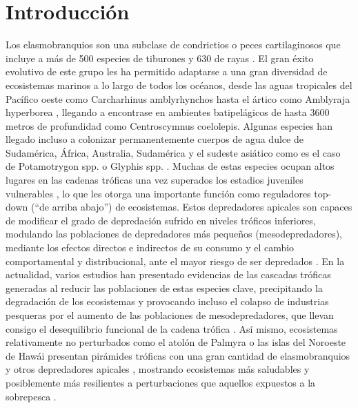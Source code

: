 \documentclass[a4paper, 11pt]{article}
\begin{document}
\section{Introducción}
Los elasmobranquios son una subclase de condrictios o peces cartilaginosos que incluye a más de 500 especies de tiburones y 630 de rayas \cite{Elbert2013}. El gran éxito evolutivo de este grupo les ha permitido adaptarse a una gran diversidad de ecosistemas marinos a lo largo de todos los océanos, desde las aguas tropicales del Pacífico oeste como Carcharhinus amblyrhynchos \cite{Wetherbee1997} hasta el ártico como Amblyraja hyperborea \cite{Lynghammar2012}, llegando a encontrase en ambientes batipelágicos de hasta 3600 metros de profundidad como Centroscymnus coelolepis. Algunas especies han llegado incluso a colonizar permanentemente cuerpos de agua dulce de Sudamérica, África, Australia, Sudamérica y el sudeste asiático como es el caso de Potamotrygon spp. o Glyphis spp. \cite{Martin2004}.
Muchas de estas especies ocupan altos lugares en las cadenas tróficas una vez superados los estadios juveniles vulnerables \cite{Compagno1990, Cortes1999}, lo que les otorga una importante función como reguladores top-down (“de arriba abajo”) de ecosistemas. Estos depredadores apicales son capaces de modificar el grado de depredación sufrido en niveles tróficos inferiores, modulando las poblaciones de depredadores más pequeños (mesodepredadores), mediante los efectos directos e indirectos de su consumo y el cambio comportamental y distribucional, ante el mayor riesgo de ser depredados \cite{Heithaus2004,Ritchie2009}. En la actualidad, varios estudios han presentado evidencias de las cascadas tróficas generadas al reducir las poblaciones de estas especies clave, precipitando la degradación de los ecosistemas y provocando incluso el colapso de industrias pesqueras por el aumento de las poblaciones de mesodepredadores, que llevan consigo el desequilibrio funcional de la cadena trófica \cite{Baum2003, Bascompte2005}. Así mismo, ecosistemas relativamente no perturbados como el atolón de Palmyra o las islas del Noroeste de Hawái presentan pirámides tróficas con una gran cantidad de elasmobranquios y otros depredadores apicales \cite{Friedlander2002,  Bradley2017}, mostrando ecosistemas más saludables y posiblemente más resilientes a perturbaciones que aquellos expuestos a la sobrepesca \cite{Sandin2008}. 
\end{document}
